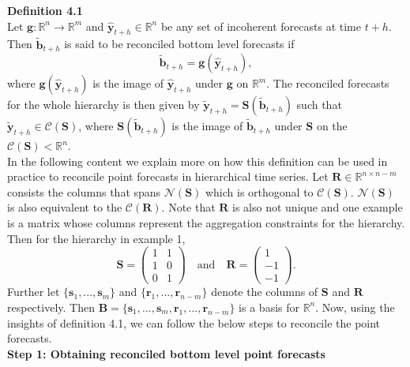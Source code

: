 \documentclass[a4paper, 11pt]{article}
\begin{document}
\noindent
\textbf{Definition 4.1}\\
\noindent
Let $\bm{g}:\bm{\mathbb{R}}^n \rightarrow \bm{\mathbb{R}}^m $ and $\hat{\bm{y}}_{t+h} \in \bm{\mathbb{R}}^n$ be any set of incoherent forecasts at time $t+h$. Then $\tilde{\bm{b}}_{t+h}$ is said to be reconciled bottom level forecasts if 
\begin{equation}
\tilde{\bm{b}}_{t+h}=\bm{g}(\hat{\bm{y}}_{t+h}),
\end{equation}
\noindent
where $\bm{g}(\hat{\bm{y}}_{t+h})$ is the image of $\hat{\bm{y}}_{t+h}$ under $\bm{g}$ on $\bm{\mathbb{R}}^m$. The reconciled forecasts for the whole hierarchy is then given by $\tilde{\bm{y}}_{t+h}=\bm{S}(\tilde{\bm{b}}_{t+h})$ such that $\tilde{\bm{y}}_{t+h} \in \mathscr{C}(\bm{S})$, where $\bm{S}(\tilde{\bm{b}}_{t+h})$ is the image of $\tilde{\bm{b}}_{t+h}$ under $\bm{S}$ on the $\mathscr{C}(\bm{S}) < \bm{\mathbb{R}}^n$.\\

\noindent
In the following content we explain more on how this definition can be used in practice to reconcile point forecasts in hierarchical time series. Let $\bm{R} \in \bm{\mathbb{R}}^{n \times n-m}$ consists the columns that spans $\mathscr{N}(\bm{S})$ which is orthogonal to $\mathscr{C}(\bm{S})$. $\mathscr{N}(\bm{S})$ is also equivalent to the $\mathscr{C}(\bm{R})$. Note that $\bm{R}$ is also not unique and one example is a matrix whose columns represent the aggregation constraints for the hierarchy. Then for the hierarchy in example 1, $$ \mathbold{S} = \begin{pmatrix} 1& 1 \\ 1 & 0 \\ 0&1 \end{pmatrix} \quad \text{and} \quad \mathbold{R} = \begin{pmatrix}  1 \\ -1 \\ -1 \end{pmatrix}.$$ 
\noindent
Further let $\{\bm{s}_1,...,\bm{s}_m\}$ and $\{\bm{r}_1,...,\bm{r}_{n-m}\}$ denote the columns of $\bm{S}$ and $\bm{R}$ respectively. Then $\bm{B}=\{\bm{s}_1,...,\bm{s}_m, \bm{r}_1,...,\bm{r}_{n-m}\}$ is a basis for $\bm{\mathbb{R}}^n$. Now, using the insights of definition 4.1, we can follow the below steps to reconcile the point forecasts.\\

\noindent
\textbf{Step 1: Obtaining reconciled bottom level point forecasts}\\
\end{document}
